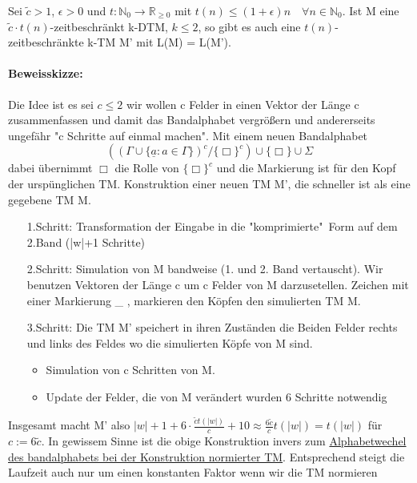     Sei \(\tilde{c} > 1\), \(\epsilon > 0\) und \(t: \mathbb{N}_0 \to \mathbb{R}_{\geq 0}\) mit \(t(n) \leq (1+ \epsilon)n \quad \forall n \in \mathbb{N}_0\). Ist M eine \(\tilde{c}\cdot t(n)\)-zeitbeschränkt k-DTM, \(k \leq 2\), so gibt es auch eine \(t(n)\)-zeitbeschränkte k-TM M' mit L(M) = L(M').
    \paragraph*{Beweisskizze:}    
        Die Idee ist es sei \(c \leq 2\) wir wollen c Felder in einen Vektor der Länge c zusammenfassen und damit das Bandalphabet vergrößern und andererseits ungefähr "c Schritte auf einmal machen".
        Mit einem neuen Bandalphabet 
        \[
            ((\Gamma \cup \{\underline{a}: a \in \Gamma\})^c/\{\Box\}^c) \cup \{\Box\} \cup \Sigma
        \]
        dabei übernimmt \(\Box\) die Rolle von \(\{\Box\}^c\) und die Markierung ist für den Kopf der urspünglichen TM. 
        Konstruktion einer neuen TM M', die schneller ist als eine gegebene TM M.
        \begin{itemize}
            \item [1.Schritt:] Transformation der Eingabe in die "komprimierte"\ Form auf dem 2.Band (|w|+1 Schritte)
            \item [2.Schritt:] Simulation von M bandweise (1. und 2. Band vertauscht). Wir benutzen Vektoren der Länge c um c Felder von M darzusetellen. Zeichen mit einer Markierung \_ , markieren den Köpfen den simulierten TM M.
            \item [3.Schritt:] Die TM M' speichert in ihren Zuständen die Beiden Felder rechts und links des Feldes wo die simulierten Köpfe von M sind. 
            \begin{itemize}
                \item Simulation von c Schritten von M.
                \item Update der Felder, die von M verändert wurden 6 Schritte notwendig
            \end{itemize}
        \end{itemize}
        Insgesamt macht M' also \(|w|+ 1 + 6\cdot \frac{\tilde{c}t(|w|)}{c} + 10 \approx \frac{6\tilde{c}}{c} t(|w|) = t(|w|)\) für \(c := 6\tilde{c}\). In gewissem Sinne ist die obige Konstruktion invers zum \hyperref[subsec:2.18]{Alphabetwechel des bandalphabets bei der Konstruktion normierter TM}. Entsprechend steigt die Laufzeit auch nur um einen konstanten Faktor wenn wir die TM normieren 

